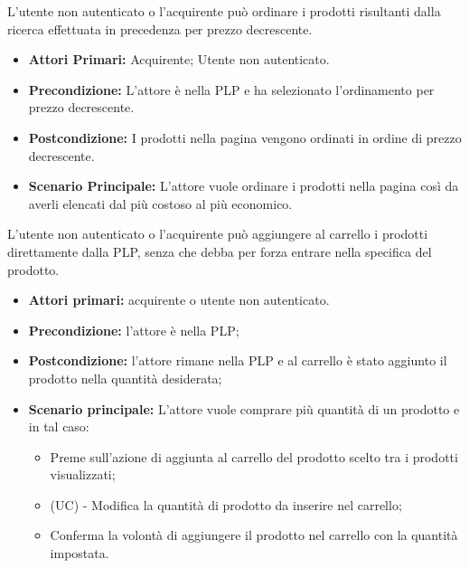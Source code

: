 L'utente non autenticato o l'acquirente può ordinare i prodotti risultanti dalla ricerca effettuata in precedenza per prezzo decrescente.
\begin{itemize}
    \item \textbf{Attori Primari:} Acquirente; Utente non autenticato.
    \item \textbf{Precondizione:} L'attore è nella PLP e ha selezionato l'ordinamento per prezzo decrescente.
    \item \textbf{Postcondizione:} I prodotti nella pagina vengono ordinati in ordine di prezzo decrescente.
    \item \textbf{Scenario Principale:} L'attore vuole ordinare i prodotti nella pagina così da averli elencati dal più costoso al più economico.
\end{itemize}

L'utente non autenticato o l'acquirente può aggiungere al carrello i prodotti direttamente dalla PLP, senza che debba per forza entrare nella  specifica del prodotto.
\begin{itemize}
    \item \textbf{Attori primari:} acquirente o  utente non autenticato.
    \item \textbf{Precondizione:} l'attore è nella PLP;
    \item \textbf{Postcondizione:} l'attore rimane nella PLP e al carrello è stato aggiunto il prodotto nella quantità desiderata;
    \item \textbf{Scenario principale:} L'attore vuole comprare più quantità di un prodotto e in tal caso:
    \begin{itemize}
        \item Preme sull'azione di aggiunta al carrello del prodotto scelto tra i prodotti visualizzati;
          \item (UC) - Modifica la quantità di prodotto da inserire nel carrello;
        \item Conferma la volontà di aggiungere il prodotto nel carrello con la quantità impostata.
    \end{itemize}
\end{itemize}
